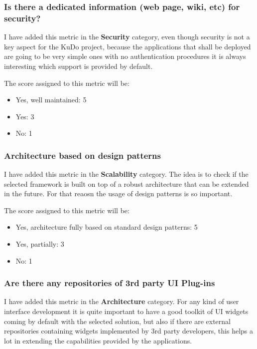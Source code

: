 \documentclass[a4paper,12pt]{book}
\begin{document}
\subsubsection{Is there a dedicated information (web page, wiki, etc) for security?}
\label{Is there a dedicated information (web page, wiki, etc) for security?}

I have added this metric in the \textbf{Security} category, even though security is not a key aspect for the KuDo project, because the applications that shall be deployed are going to be very simple ones with no authentication procedures it is always interesting which support is provided by default.

The score assigned to this metric will be:
\begin{itemize}
 \item Yes, well maintained: 5
 \item Yes: 3
 \item No: 1
\end{itemize}

\subsubsection{Architecture based on design patterns}
\label{Architecture based on design patterns}

I have added this metric in the \textbf{Scalability} category. The idea is to check if the selected framework is built on top of a robust architecture that can be extended in the future. For that reaosn the usage of design patterns is so important.

The score assigned to this metric will be:
\begin{itemize}
 \item Yes, architecture fully based on standard design patterns: 5
 \item Yes, partially: 3
 \item No: 1
\end{itemize}

\subsubsection{Are there any repositories of 3rd party UI Plug-ins}
\label{Are there any repositories of 3rd party UI Plug-ins}

I have added this metric in the \textbf{Architecture} category. For any kind of user interface development it is quite important to have a good toolkit of UI widgets coming by default with the selected solution, but also if there are external repositories containing widgets implemented by 3rd party developers, this helps a lot in extending the capabilities provided by the applications.
\end{document}
